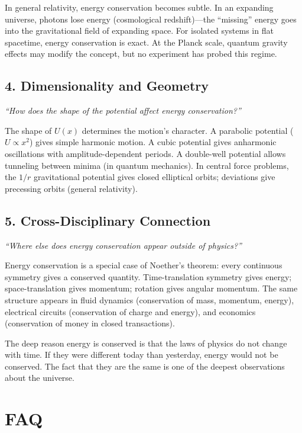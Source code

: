 In general relativity, energy conservation becomes subtle. In an expanding universe, photons lose energy (cosmological redshift)---the ``missing'' energy goes into the gravitational field of expanding space. For isolated systems in flat spacetime, energy conservation is exact. At the Planck scale, quantum gravity effects may modify the concept, but no experiment has probed this regime.

\subsection*{4. Dimensionality and Geometry}
\textit{``How does the shape of the potential affect energy conservation?''}

The shape of $U(x)$ determines the motion's character. A parabolic potential ($U \propto x^2$) gives simple harmonic motion. A cubic potential gives anharmonic oscillations with amplitude-dependent periods. A double-well potential allows tunneling between minima (in quantum mechanics). In central force problems, the $1/r$ gravitational potential gives closed elliptical orbits; deviations give precessing orbits (general relativity).

\subsection*{5. Cross-Disciplinary Connection}
\textit{``Where else does energy conservation appear outside of physics?''}

Energy conservation is a special case of Noether's theorem: every continuous symmetry gives a conserved quantity. Time-translation symmetry gives energy; space-translation gives momentum; rotation gives angular momentum. The same structure appears in fluid dynamics (conservation of mass, momentum, energy), electrical circuits (conservation of charge and energy), and economics (conservation of money in closed transactions).

The deep reason energy is conserved is that the laws of physics do not change with time. If they were different today than yesterday, energy would not be conserved. The fact that they are the same is one of the deepest observations about the universe.


\section*{FAQ}

